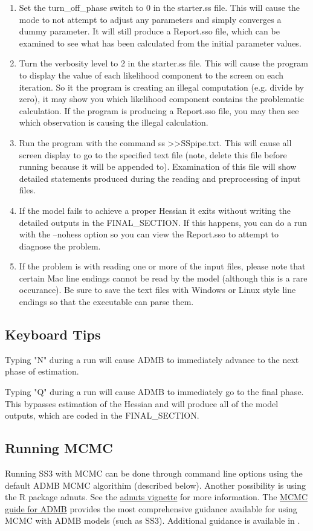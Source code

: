 \begin{enumerate}
	\item Set the turn\_off\_phase switch to 0 in the starter.ss file.  This will cause the mode to not attempt to adjust any parameters and simply converges a dummy parameter.  It will still produce a Report.sso file, which can be examined to see what has been calculated from the initial parameter values.
	\item Turn the verbosity level to 2 in the starter.ss file.  This will cause the program to display the value of each likelihood component to the screen on each iteration.  So it the program is creating an illegal computation (e.g. divide by zero), it may show you which likelihood component contains the problematic calculation.  If the program is producing a Report.sso file, you may then see which observation is causing the illegal calculation.
	\item Run the program with the command ss >>SSpipe.txt.  This will cause all screen display to go to the specified text file (note, delete this file before running because it will be appended to).  Examination of this file will show detailed statements produced during the reading and preprocessing of input files.
	\item If the model fails to achieve a proper Hessian it exits without writing the detailed outputs in the FINAL\_SECTION.  If this happens, you can do a run with the –nohess option so you can view the Report.sso to attempt to diagnose the problem.
	\item If the problem is with reading one or more of the input files, please note that certain Mac line endings cannot be read by the model (although this is a rare occurance). Be sure to save the text files with Windows or Linux style line endings so that the executable can parse them.
\end{enumerate}

\subsection{Keyboard Tips}
Typing "N" during a run will cause ADMB to immediately advance to the next phase of estimation.

Typing "Q"  during a run will cause ADMB to immediately go to the final phase.  This bypasses estimation of the Hessian and will produce all of the model outputs, which are coded in the FINAL\_SECTION.

\subsection{Running MCMC}
 Running SS3 with MCMC can be done through command line options using the default ADMB MCMC algorithim (described below). Another possibility is using the R package adnuts. See the \href{https://cran.r-project.org/web/packages/adnuts/vignettes/adnuts.html}{adnuts vignette} for more information. The \href{https://www.admb-project.org/developers/mcmc/mcmc-guide-for-admb.pdf}{MCMC guide for ADMB} provides the most comprehensive guidance available for using MCMC with ADMB models (such as SS3). Additional guidance is available in \citep{monnahan2019overcoming}.

